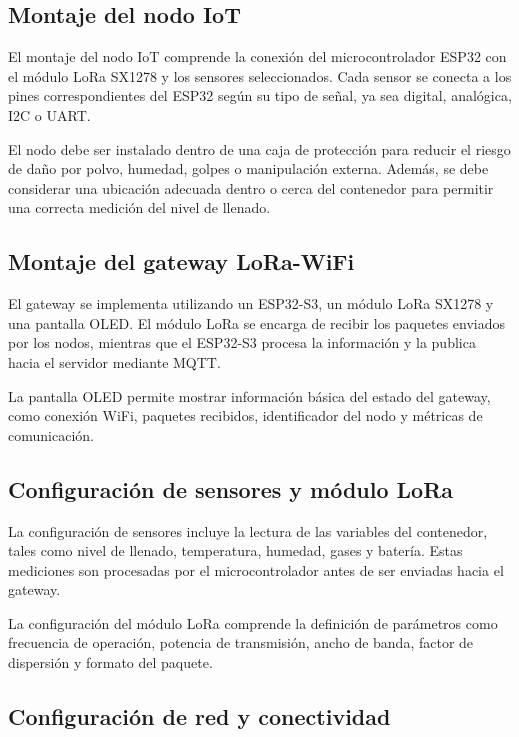 \subsection{Montaje del nodo IoT}

El montaje del nodo IoT comprende la conexión del microcontrolador ESP32 con el módulo LoRa SX1278 y los sensores seleccionados. Cada sensor se conecta a los pines correspondientes del ESP32 según su tipo de señal, ya sea digital, analógica, I2C o UART.

El nodo debe ser instalado dentro de una caja de protección para reducir el riesgo de daño por polvo, humedad, golpes o manipulación externa. Además, se debe considerar una ubicación adecuada dentro o cerca del contenedor para permitir una correcta medición del nivel de llenado.

\subsection{Montaje del gateway LoRa-WiFi}

El gateway se implementa utilizando un ESP32-S3, un módulo LoRa SX1278 y una pantalla OLED. El módulo LoRa se encarga de recibir los paquetes enviados por los nodos, mientras que el ESP32-S3 procesa la información y la publica hacia el servidor mediante MQTT.

La pantalla OLED permite mostrar información básica del estado del gateway, como conexión WiFi, paquetes recibidos, identificador del nodo y métricas de comunicación.

\subsection{Configuración de sensores y módulo LoRa}

La configuración de sensores incluye la lectura de las variables del contenedor, tales como nivel de llenado, temperatura, humedad, gases y batería. Estas mediciones son procesadas por el microcontrolador antes de ser enviadas hacia el gateway.

La configuración del módulo LoRa comprende la definición de parámetros como frecuencia de operación, potencia de transmisión, ancho de banda, factor de dispersión y formato del paquete.

\subsection{Configuración de red y conectividad}

